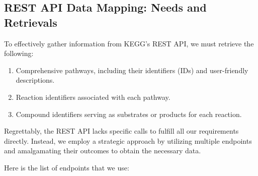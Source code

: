 \subsection{REST API Data Mapping: Needs and Retrievals}

To effectively gather information from KEGG's REST API, we must retrieve the following:

\begin{enumerate}
\item Comprehensive pathways, including their identifiers (IDs) and user-friendly descriptions.
\item Reaction identifiers associated with each pathway.
\item Compound identifiers serving as substrates or products for each reaction.
\end{enumerate}

Regrettably, the REST API lacks specific calls to fulfill all our requirements directly. Instead, we employ a strategic approach by utilizing multiple endpoints and amalgamating their outcomes to obtain the necessary data.

Here is the list of endpoints that we use:

